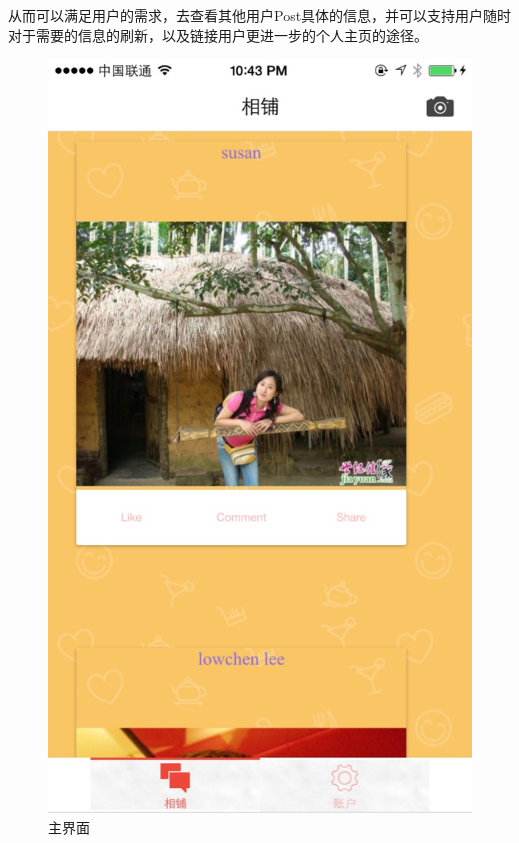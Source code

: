 从而可以满足用户的需求，去查看其他用户Post具体的信息，并可以支持用户随时对于需要的信息的刷新，以及链接用户更进一步的个人主页的途径。
\begin{figure}[h] 
\begin{minipage}[t]{0.3\linewidth}
\centering
\includegraphics[width=\textwidth]{img/chap4/info1.jpg}
\caption{主界面\label{flickr}}
\end{minipage}
\hfill
\begin{minipage}[t]{0.3\linewidth}

\end{minipage}
\end{figure}

